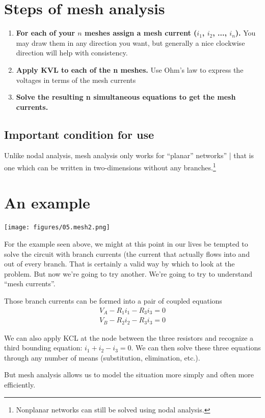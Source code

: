 \documentclass[11pt]{book}
\begin{document}
\section{Steps of mesh analysis}
\begin{enumerate}
	\item \textbf{For each of your $n$ meshes assign a mesh current ($i_1$, $i_2$, ..., $i_n$).} You may draw them in any direction you want, but generally a nice clockwise direction will help with consistency.
	\item \textbf{Apply KVL to each of the n meshes.} Use Ohm’s law to express the voltages in terms of the mesh currents
	\item \textbf{Solve the resulting n simultaneous equations to get the mesh currents.}
\end{enumerate}

\subsection{Important condition for use}
Unlike nodal analysis, mesh analysis only works for ``planar” networks'' | that is one which can be written in two-dimensions without any branches.\footnote{Nonplanar networks can still be solved using nodal analysis.}

\section{An example}
\texttt{[image: figures/05.mesh2.png]}

For the example seen above, we might at this point in our lives be tempted to solve the circuit with branch currents (the current that actually flows into and out of every branch. That is certainly a valid way by which to look at the problem. But now we're going to try another. We're going to try to understand ``mesh currents''.

Those branch currents can be formed into a pair of coupled equations
\begin{eqnarray}
	V_A - R_1 i_1 - R_3 i_3 = 0 \\
	V_B - R_2 i_2 - R_3 i_3 = 0 
\end{eqnarray}

We can also apply KCL at the node between the three resistors and recognize a third bounding equation: $i_1 + i_2 - i_3 = 0$. We can then solve these three equations through any number of means (substitution, elimination, etc.).

But mesh analysis allows us to model the situation more simply and often more efficiently.
\end{document}
